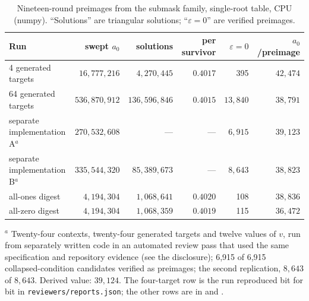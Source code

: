 \documentclass[11pt,a4paper]{article}
\begin{document}
\begin{table}[t]
\centering\footnotesize
\caption{Nineteen-round preimages from the submask family, single-root table,
CPU (numpy).  ``Solutions'' are triangular solutions; ``$\varepsilon=0$'' are
verified preimages.}
\label{tab:r19}
\begin{tabular}{@{}lrrrrr@{}}
\toprule
Run & swept $a_0$ & solutions & per survivor & $\varepsilon=0$ & $a_0$/preimage \\
\midrule
4 generated targets & $16{,}777{,}216$ & $4{,}270{,}445$ & $0.4017$ & 395 & $42{,}474$ \\
64 generated targets & $536{,}870{,}912$ & $136{,}596{,}846$ & $0.4015$ & $13{,}840$ & $38{,}791$ \\
separate implementation A$^{a}$ & $270{,}532{,}608$ & --- & --- & $6{,}915$ & $39{,}123$ \\
separate implementation B$^{a}$ & $335{,}544{,}320$ & $85{,}389{,}673$ & --- & $8{,}643$ & $38{,}823$ \\
\midrule
all-ones digest~\cite{Zaikin2026} & $4{,}194{,}304$ & $1{,}068{,}641$ & $0.4020$ & 108 & $38{,}836$ \\
all-zero digest~\cite{Davydov2025} & $4{,}194{,}304$ & $1{,}068{,}359$ & $0.4019$ & 115 & $36{,}472$ \\
\bottomrule
\end{tabular}
\begin{minipage}{0.95\textwidth}\footnotesize\vspace{2pt}
$^{a}$ Twenty-four contexts, twenty-four generated targets and twelve values of $v$, run
from separately written code in an automated review pass that used the same
specification and repository evidence (see the disclosure); 6{,}915 of 6{,}915
collapsed-condition candidates verified as preimages; the second replication,
$8{,}643$ of $8{,}643$.  Derived value: $39{,}124$.  The four-target row is the
run reproduced bit for bit in \texttt{reviewers/reports.json}; the other rows
are in  and .
\end{minipage}
\end{table}
\end{document}
